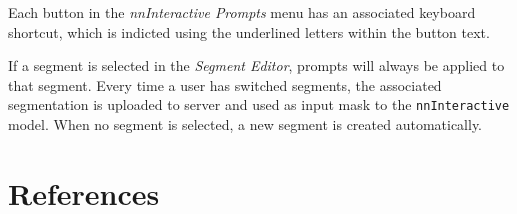 \documentclass[
]{article}
\begin{document}
Each button in the \emph{nnInteractive Prompts} menu has an associated
keyboard shortcut, which is indicted using the underlined letters within
the button text.

If a segment is selected in the \emph{Segment Editor}, prompts will
always be applied to that segment. Every time a user has switched
segments, the associated segmentation is uploaded to server and used as
input mask to the \texttt{nnInteractive} model. When no segment is
selected, a new segment is created automatically.

\section*{References}\label{references}

\label{refs}
\end{document}

